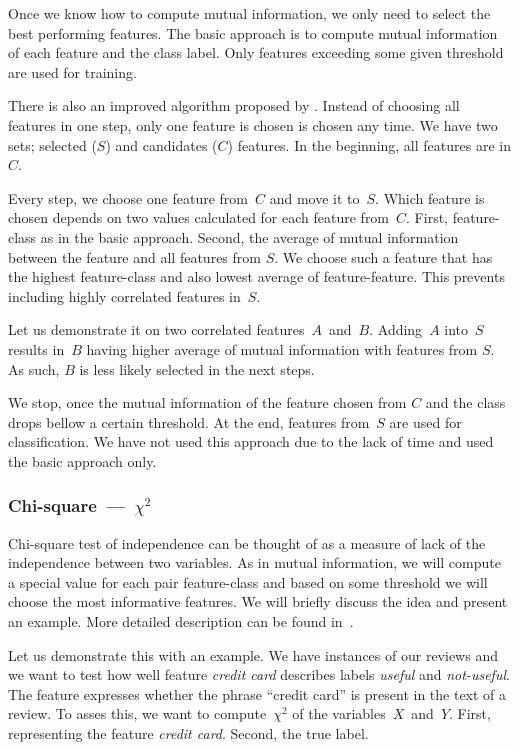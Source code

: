 Once we know how to compute mutual information,
we only need to select the best performing features.
The basic approach is to compute mutual information of each feature and the class label.
Only features exceeding some given threshold are used for training.

There is also an improved algorithm proposed by \citet{Hoq14}.
Instead of choosing all features in one step,
only one feature is chosen is chosen any time.
We have two sets; selected ($S$) and candidates ($C$) features.
In the beginning, all features are in $C$.

Every step, we choose one feature from~$C$ and move it to~$S$.
Which feature is chosen depends on two values calculated for each feature from~$C$.
First, feature-class as in the basic approach.
Second, the average of mutual information between the feature and all features from $S$.
We choose such a feature that has the highest feature-class and also lowest average of feature-feature.
This prevents including highly correlated features in~$S$.

Let us demonstrate it on two correlated features~$A$~and~$B$.
Adding~$A$ into~$S$ results in~$B$ having higher average of mutual information with features from $S$.
As such, $B$ is less likely selected in the next steps.

We stop, once the mutual information of the feature chosen from $C$ and the class drops bellow a certain
threshold.
At the end, features from~$S$ are used for classification.
We have not used this approach due to the lack of time and used the basic approach only.


\subsubsection{Chi-square~---~$\chi^2$}

Chi-square test of independence can be thought of
as a measure of lack of the independence between two variables.
As in mutual information,
we will compute a special value for each pair feature-class
and based on some threshold we will choose the most informative features.
We will briefly discuss the idea and present an example.
More detailed description can be found in~\citet{Hugh13}.


Let us demonstrate this with an example.
We have instances of our reviews and we want to test how well
feature \textit{credit card} describes
labels \textit{useful} and \textit{not-useful}.
The feature expresses whether the phrase ``credit card'' is present in the text of a review.
To asses this, we want to compute~$\chi^2$ of the variables~$X$~and~$Y$.
First, representing the feature \textit{credit card}.
Second, the true label.

